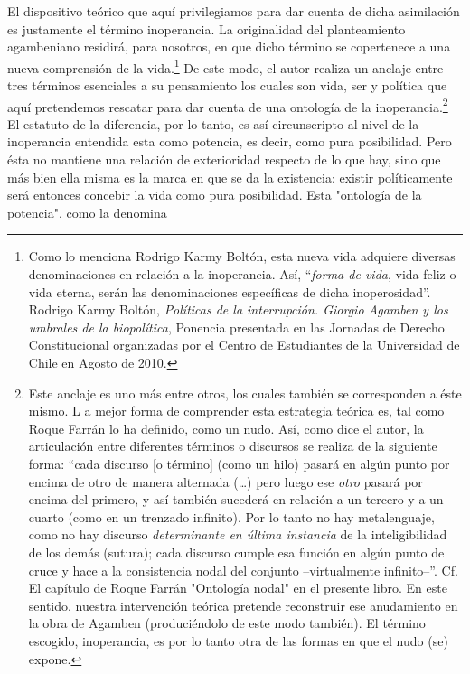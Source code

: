 \documentclass{book}
\begin{document}
El dispositivo teórico que aquí privilegiamos para dar cuenta de dicha
asimilación es justamente el término inoperancia. La originalidad del
planteamiento agambeniano residirá, para nosotros, en que dicho término
se copertenece a una nueva comprensión de la vida.\footnote{Como lo
  menciona Rodrigo Karmy Boltón, esta nueva vida adquiere diversas
  denominaciones en relación a la inoperancia. Así, \enquote{\emph{forma de vida},
  {vida feliz} o {vida eterna}, serán las denominaciones específicas
  de dicha inoperosidad}. Rodrigo Karmy Boltón, \emph{Políticas de la
  interrupción. Giorgio Agamben y los umbrales de la biopolítica},
  Ponencia presentada en las Jornadas de Derecho Constitucional
  organizadas por el Centro de Estudiantes de la Universidad de Chile en Agosto de 2010.}
  De este modo, el autor realiza un anclaje entre tres términos esenciales a su
pensamiento los cuales son vida, ser y política que aquí pretendemos
rescatar para dar cuenta de una ontología de la inoperancia.\footnote{Este
  anclaje es uno más entre otros, los cuales también se corresponden a
  éste mismo. L
  a mejor forma de comprender esta estrategia teórica es,
  tal como Roque Farrán lo ha definido, como un nudo. Así, como dice el
  autor, la articulación entre diferentes términos o discursos se
  realiza de la siguiente forma: \enquote{cada discurso {[}o término{]} (como un
  hilo) pasará en algún punto por encima de otro de manera alternada
  (\dots) pero luego ese \emph{otro} pasará por encima del primero,
  y así también sucederá en relación a un tercero y a un cuarto (como en
  un trenzado infinito). Por lo tanto no hay metalenguaje, como no hay
  discurso \emph{determinante en última instancia} de la inteligibilidad
  de los demás (sutura); cada discurso cumple esa función en algún punto
  de cruce y hace a la consistencia nodal del conjunto --virtualmente
  infinito--}. Cf. El capítulo de Roque Farrán "Ontología nodal" en el
  presente libro. En este sentido, nuestra intervención teórica pretende
  reconstruir ese anudamiento en la obra de Agamben (produciéndolo de
  este modo también). El término escogido, inoperancia, es por lo tanto
  otra de las formas en que el nudo (se) expone.} El estatuto de la
diferencia, por lo tanto, es así circunscripto al nivel de la
inoperancia entendida esta como potencia, es decir, como pura
posibilidad. Pero ésta no mantiene una relación de exterioridad respecto
de lo que hay, sino que más bien ella misma es la marca en que se da la
existencia: existir políticamente será entonces concebir la vida como
pura posibilidad. Esta "ontología de la potencia", como la denomina
\end{document}
